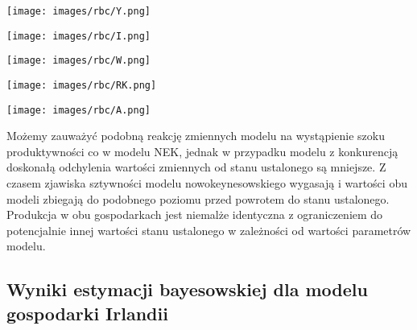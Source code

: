 \begin{center}
    \begin{minipage}{.3\textwidth}
      \centering
      \captionsetup{type=figure}
      \texttt{[image: images/rbc/Y.png]}
      \label{fig:rbc:Y}
    \end{minipage}%
    \begin{minipage}{.3\textwidth}
      \centering
      \captionsetup{type=figure}
      \texttt{[image: images/rbc/I.png]}
      \label{fig:rbc:I}
    \end{minipage}
    \begin{minipage}{.3\textwidth}
      \centering
      \captionsetup{type=figure}
      \texttt{[image: images/rbc/W.png]}
      \label{fig:rbc:W}
    \end{minipage}
\end{center}

\begin{center}
    \begin{minipage}{.4\textwidth}
      \centering
      \captionsetup{type=figure}
      \texttt{[image: images/rbc/RK.png]}
      \label{fig:rbc:RK}
    \end{minipage}%
    \begin{minipage}{.4\textwidth}
      \centering
      \captionsetup{type=figure}
      \texttt{[image: images/rbc/A.png]}
      \label{fig:rbc:A}
    \end{minipage}
\end{center}
Możemy zauważyć podobną reakcję zmiennych modelu na wystąpienie szoku produktywności co w modelu NEK, jednak w przypadku modelu z konkurencją doskonałą odchylenia wartości zmiennych od stanu ustalonego są mniejsze. Z czasem zjawiska sztywności modelu nowokeynesowskiego wygasają i wartości obu modeli zbiegają do podobnego poziomu przed powrotem do stanu ustalonego. Produkcja w obu gospodarkach jest niemalże identyczna z ograniczeniem do potencjalnie innej wartości stanu ustalonego w zależności od wartości parametrów modelu.

\subsection{Wyniki estymacji bayesowskiej dla modelu gospodarki Irlandii}

